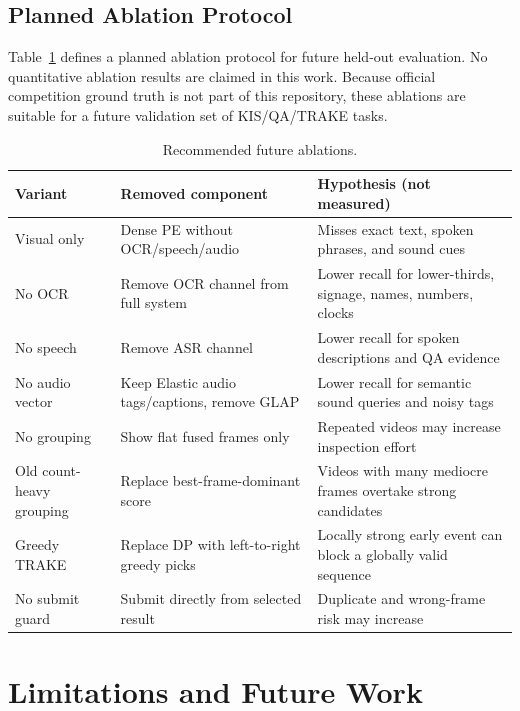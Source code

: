 \documentclass[conference]{IEEEtran}
\begin{document}
\subsection{Planned Ablation Protocol}

Table~\ref{tab:ablation} defines a planned ablation protocol for future held-out
evaluation. No quantitative ablation results are claimed in this work. Because
official competition ground truth is not part of this repository, these ablations
are suitable for a future validation set of KIS/QA/TRAKE tasks.

\begin{table}[!t]
\centering
\caption{Recommended future ablations.}
\label{tab:ablation}
\scriptsize
\setlength{\tabcolsep}{2pt}
\begin{tabularx}{\columnwidth}{@{}>{\raggedright\arraybackslash}p{}>{\raggedright\arraybackslash}p{}X@{}}
\toprule
Variant & Removed component & Hypothesis (not measured) \\
\midrule
Visual only & Dense PE without OCR/speech/audio & Misses exact text, spoken phrases, and sound cues \\
No OCR & Remove OCR channel from full system & Lower recall for lower-thirds, signage, names, numbers, clocks \\
No speech & Remove ASR channel & Lower recall for spoken descriptions and QA evidence \\
No audio vector & Keep Elastic audio tags/captions, remove GLAP & Lower recall for semantic sound queries and noisy tags \\
No grouping & Show flat fused frames only & Repeated videos may increase inspection effort \\
Old count-heavy grouping & Replace best-frame-dominant score & Videos with many mediocre frames overtake strong candidates \\
Greedy TRAKE & Replace DP with left-to-right greedy picks & Locally strong early event can block a globally valid sequence \\
No submit guard & Submit directly from selected result & Duplicate and wrong-frame risk may increase \\
\bottomrule
\end{tabularx}
\end{table}

\section{Limitations and Future Work}
\end{document}
